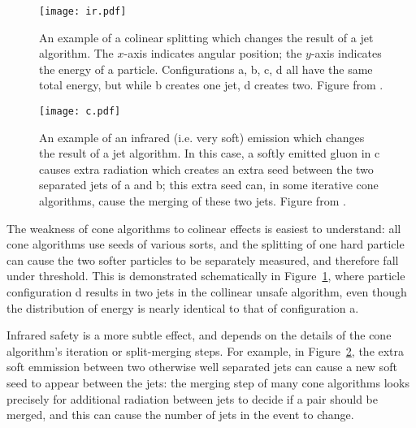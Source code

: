 
\begin{figure}
\centering
\texttt{[image: ir.pdf]}
\label{fig:jets:ir}
\caption{An example of a colinear splitting which changes the result of a jet algorithm. The $x$-axis indicates angular position; the $y$-axis indicates the energy of a particle. Configurations a, b, c, d all have the same total energy, but while b creates one jet, d creates two. Figure from \cite{Jetography}.}
\end{figure}



\begin{figure}
\centering
\texttt{[image: c.pdf]}
\label{fig:jets:c}
\caption{An example of an infrared (i.e. very soft) emission which changes the result of a jet algorithm. In this case, a softly emitted gluon in c causes extra radiation which creates an extra seed between the two separated jets of a and b; this extra seed can, in some iterative cone algorithms, cause the merging of these two jets. Figure from \cite{Jetography}.}
\end{figure}


The weakness of cone algorithms to colinear effects is easiest to understand: all cone algorithms use seeds of various sorts, and the splitting of one hard particle can cause the two softer particles to be separately measured, and therefore fall under threshold. This is demonstrated schematically in Figure~\ref{fig:jets:ir}, where particle configuration d results in two jets in the collinear unsafe algorithm, even though the distribution of energy is nearly identical to that of configuration a.

Infrared safety is a more subtle effect, and depends on the details of the cone algorithm's iteration or split-merging steps. For example, in Figure~\ref{fig:jets:c}, the extra soft emmission between two otherwise well separated jets can cause a new soft seed to appear between the jets: the merging step of many cone algorithms looks precisely for additional radiation between jets to decide if a pair should be merged, and this can cause the number of jets in the event to change.

